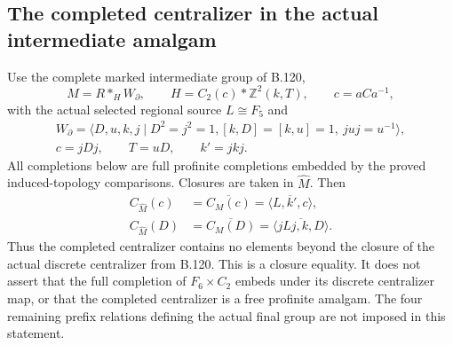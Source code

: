 \subsection*{The completed centralizer in the actual intermediate amalgam}

\label{stmt:B122}
Use the complete marked intermediate group of B.120,
\[
 M=R*_{H}W_{\partial},\qquad
 H=C_2(c)*\mathbb Z^2(k,T),\qquad c=aCa^{-1},
\]
with the actual selected regional source $L\cong F_5$ and
\[
 \begin{gathered}
 W_{\partial}=\langle D,u,k,j\mid D^2=j^2=1,
 [k,D]=[k,u]=1,\ juj=u^{-1}\rangle,\\
 c=jDj,\qquad T=uD,\qquad k'=jkj.
 \end{gathered}
\]
All completions below are full profinite completions embedded by
the proved induced-topology comparisons. Closures are taken in
$\widehat M$. Then
\begin{equation}\label{eq:B122-closure-centralizers}
 \begin{aligned}
 C_{\widehat M}(c)
   &=\overline{C_M(c)}
     =\overline{\langle L,k',c\rangle},\\
 C_{\widehat M}(D)
   &=\overline{C_M(D)}
     =\overline{\langle jLj,k,D\rangle}.
 \end{aligned}
\end{equation}
Thus the completed centralizer contains no elements beyond the
closure of the actual discrete centralizer from B.120. This is a
closure equality. It does not assert that the full completion of
$F_6\times C_2$ embeds under its discrete centralizer map, or that
the completed centralizer is a free profinite amalgam. The four
remaining prefix relations defining the actual final group are
not imposed in this statement.

